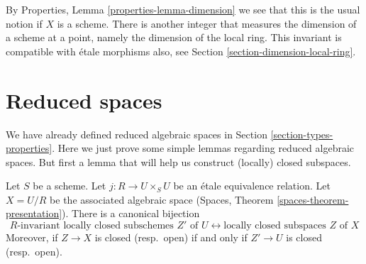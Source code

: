 \noindent
By
Properties, Lemma \ref{properties-lemma-dimension}
we see that this is the usual notion if $X$ is a scheme.
There is another integer that measures the dimension of a scheme
at a point, namely the dimension of the local ring. This invariant
is compatible with \'etale morphisms also, see
Section \ref{section-dimension-local-ring}.





\section{Reduced spaces}
\label{section-reduced}

\noindent
We have already defined reduced algebraic spaces in
Section \ref{section-types-properties}.
Here we just prove some simple lemmas regarding reduced algebraic
spaces. But first a lemma that will help us construct
(locally) closed subspaces.

\begin{lemma}
\label{lemma-subspaces-presentation}
Let $S$ be a scheme. Let $j : R \to U \times_S U$ be an \'etale equivalence
relation. Let $X = U/R$ be the associated algebraic space
(Spaces, Theorem \ref{spaces-theorem-presentation}). There is a
canonical bijection
$$
R\text{-invariant locally closed subschemes }Z'\text{ of }U
\leftrightarrow
\text{locally closed subspaces }Z\text{ of }X
$$
Moreover, if $Z \to X$ is closed (resp.\ open) if and only if
$Z' \to U$ is closed (resp.\ open).
\end{lemma}

